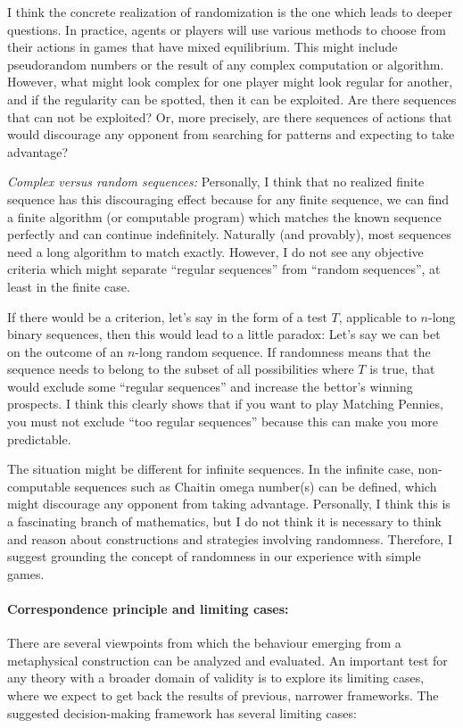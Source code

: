 \documentclass{article}
\begin{document}
I think the concrete realization of randomization is the one which leads to deeper questions.
In practice, agents or players will use various methods to choose from their actions in games that have mixed equilibrium. This might include pseudorandom numbers or the result of any complex computation or algorithm. However, what might look complex for one player might look regular for another, and if the regularity can be spotted, then it can be exploited.
Are there sequences that can not be exploited? Or, more precisely, are there sequences of actions that would discourage any opponent from searching for patterns and expecting to take advantage?

{\it Complex versus random sequences:}
Personally, I think that no realized finite sequence has this discouraging effect because for any finite sequence, we can find a finite algorithm (or computable program) which matches the known sequence perfectly and can continue indefinitely. Naturally (and provably), most sequences need a long algorithm to match exactly. However, I do not see any objective criteria which might separate ``regular sequences'' from ``random sequences'', at least in the finite case.

If there would be a criterion, let's say in the form of a test $T$, applicable to $n$-long binary sequences, then this would lead to a little paradox:
Let's say we can bet on the outcome of an $n$-long random sequence. If randomness means that the sequence needs to belong to the subset of all possibilities where $T$ is true, that would exclude some ``regular sequences'' and increase the bettor's winning prospects.
I think this clearly shows that if you want to play Matching Pennies, you must not exclude ``too regular sequences'' because this can make you more predictable.

The situation might be different for infinite sequences. In the infinite case, non-computable sequences such as Chaitin omega number(s) can be defined, which might discourage any opponent from taking advantage.
Personally, I think this is a fascinating branch of mathematics, but I do not think it is necessary to think and reason about constructions and strategies involving randomness.
Therefore, I suggest grounding the concept of randomness in our experience with simple games.

\paragraph{Correspondence principle and limiting cases:}
There are several viewpoints from which the behaviour emerging from a metaphysical construction can be analyzed and evaluated. An important test for any theory with a broader domain of validity is to explore its limiting cases, where we expect to get back the results of previous, narrower frameworks. The suggested decision-making framework has several limiting cases:
\end{document}
